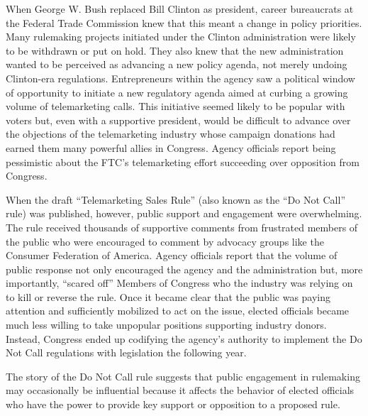 When George W. Bush replaced Bill Clinton as president, career bureaucrats at the Federal Trade Commission knew that this meant a change in policy priorities. Many rulemaking projects initiated under the Clinton administration were likely to be withdrawn or put on hold. They also knew that the new administration wanted to be perceived as advancing a new policy agenda, not merely undoing Clinton-era regulations. Entrepreneurs within the agency saw a political window of opportunity to initiate a new regulatory agenda aimed at curbing a growing volume of telemarketing calls. This initiative seemed likely to be popular with voters but, even with a supportive president, would be difficult to advance over the objections of the telemarketing industry whose campaign donations had earned them many powerful allies in Congress. Agency officials report being pessimistic about the FTC's telemarketing effort succeeding over opposition from Congress.

When the draft ``Telemarketing Sales Rule'' (also known as the ``Do Not Call'' rule) was published, however, public support and engagement were overwhelming. The rule received thousands of supportive comments from frustrated members of the public who were encouraged to comment by advocacy groups like the Consumer Federation of America. Agency officials report that the volume of public response not only encouraged the agency and the administration but, more importantly, ``scared off'' Members of Congress who the industry was relying on to kill or reverse the rule. Once it became clear that the public was paying attention and sufficiently mobilized to act on the issue, elected officials became much less willing to take unpopular positions supporting industry donors. Instead, Congress ended up codifying the agency's authority to implement the Do Not Call regulations with legislation the following year.

The story of the Do Not Call rule suggests that public engagement in rulemaking may occasionally be influential because it affects the behavior of elected officials who have the power to provide key support or opposition to a proposed rule.


